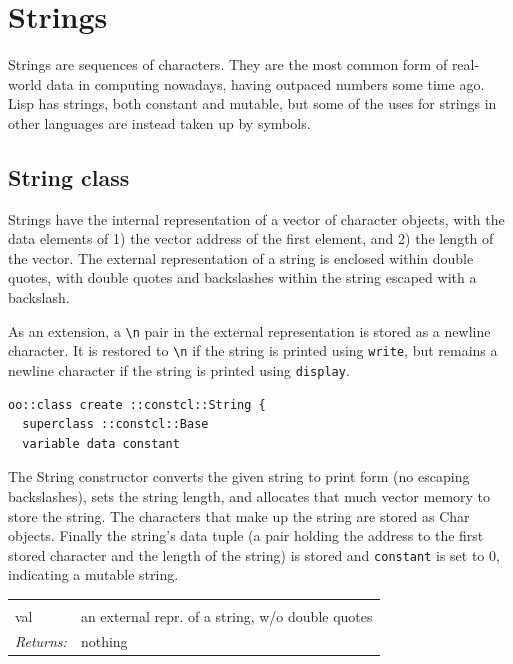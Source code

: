 \documentclass[a5paper,draft]{memoir}
\begin{document}
\section{Strings}
\label{strings}

Strings are sequences of characters. They are the most common form of real-world data in computing nowadays, having outpaced numbers some time ago. Lisp has strings, both constant and mutable, but some of the uses for strings in other languages are instead taken up by symbols.

\subsection{String class}
\label{string-class}

Strings have the internal representation of a vector of character objects, with the data elements of 1) the vector address of the first element, and 2) the length of the vector. The external representation of a string is enclosed within double quotes, with double quotes and backslashes within the string escaped with a backslash.

As an extension, a \texttt{\textbackslash n} pair in the external representation is stored as a newline character. It is restored to \texttt{\textbackslash n} if the string is printed using \texttt{write}, but remains a newline character if the string is printed using \texttt{display}.

\begin{lstlisting}
oo::class create ::constcl::String {
  superclass ::constcl::Base
  variable data constant
\end{lstlisting}

The String constructor converts the given string to print form (no escaping backslashes), sets the string length, and allocates that much vector memory to store the string. The characters that make up the string are stored as Char objects. Finally the string's data tuple (a pair holding the address to the first stored character and the length of the string) is stored and \texttt{constant} is set to 0, indicating a mutable string.

\noindent\begin{tabular}{ |p{1.9cm} p{6.5cm}| }
\hline
\rowcolor[HTML]{CCCCCC} \multicolumn{2}{|l|}{\textbf{String constructor (internal)}} \\
val & an external repr. of a string, w/o double quotes \\
\textit{Returns:} & nothing \\
\hline
\end{tabular}
\end{document}
